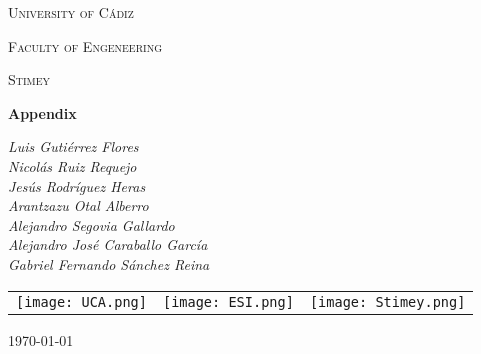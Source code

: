 \documentclass{book}
\begin{document}
	\begin{titlepage}
		\centering
		
		{\scshape\huge University of Cádiz \par}
		\vspace{1cm}
		{\scshape\LARGE Faculty of Engeneering\par}
		\vspace{1cm}
		{\scshape\Large{Stimey}\par}
		\vspace{1cm}
		{\Huge\bfseries Appendix\par}
		\vspace{1cm}
		{\Large\itshape Luis Gutiérrez Flores\\
			Nicolás Ruiz Requejo\\
			Jesús Rodríguez Heras\\
			Arantzazu Otal Alberro\\
			Alejandro Segovia Gallardo\\
			Alejandro José Caraballo García\\
			Gabriel Fernando Sánchez Reina\par}
		\vspace{2.5cm}
		\begin{table}[htb]
			\centering
			\begin{tabular}{ccc}
				\texttt{[image: UCA.png]}\par\vspace{1.2cm} & \texttt{[image: ESI.png]}\par\vspace{1.2cm} & \texttt{[image: Stimey.png]}\par\vspace{1.2cm}
			\end{tabular}
		\end{table}
				\vfill
		
		
		
				{\large \today\par}
	\end{titlepage}
\end{document}
